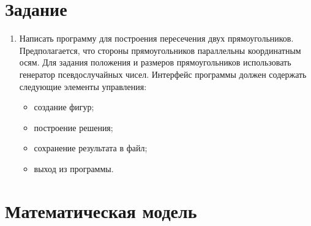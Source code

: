 \documentclass[14pt, a4paper]{extreport}
\begin{document}
\author{Новгородцев~Н.В.}
\maketitle

\chapter{Задание}

\begin{enumerate}

	\item
	Написать программу для построения пересечения двух прямоугольников. Предполагается, что стороны прямоугольников параллельны координатным осям. Для задания положения и размеров прямоугольников использовать генератор псевдослучайных чисел. Интерфейс программы должен содержать следующие элементы управления:
	\begin{itemize}
		\item создание фигур;
		\item построение решения;
		\item сохранение результата в файл;
		\item выход из программы.
	\end{itemize}

\end{enumerate}

\chapter{Математическая модель}
\end{document}
